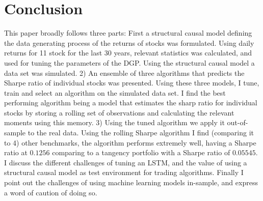 \section{Conclusion}

This paper broadly follows three parts: First a structural causal model defining the data generating process of the returns of stocks was formulated. Using daily returns for 11 stock for the last 30 years, relevant statistics was calculated, and used for tuning the parameters of the DGP. Using the structural causal model a data set was simulated. 2) An ensemble of three algorithms that predicts the Sharpe ratio of individual stocks was presented. Using these three models, I tune, train and select an algorithm on the simulated data set. I find the best performing algorithm being a model that estimates the sharp ratio for individual stocks by storing a rolling set of observations and calculating the relevant moments using this memory. 3) Using the tuned algorithm we apply it out-of-sample to the real data. Using the rolling Sharpe algorithm I find (comparing it to 4) other benchmarks, the algorithm performs extremely well, having a Sharpe ratio at $0.1256$ comparing to a tangency portfolio with a Sharpe ratio of $0.05545$. I discuss the different challenges of tuning an LSTM, and the value of using a structural causal model as test environment for trading algorithms. Finally I point out the challenges of using machine learning models in-sample, and express a word of caution of doing so.
